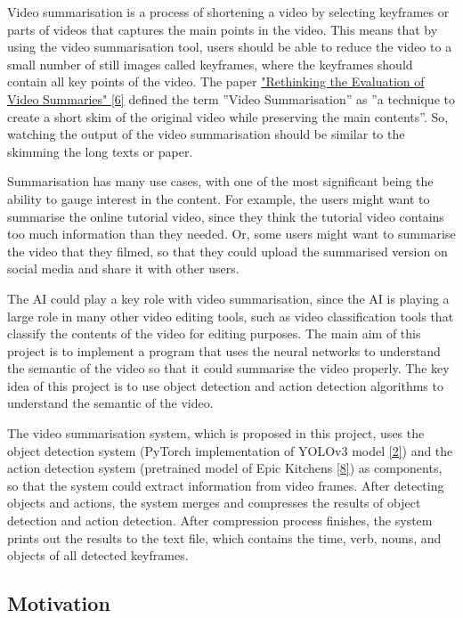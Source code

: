 \documentclass{article}
\begin{document}
Video summarisation is a process of shortening a video by selecting keyframes or parts of videos that captures the main points in the video. This means that by using the video summarisation tool, users should be able to reduce the video to a small number of still images called keyframes, where the keyframes should contain all key points of the video. The paper \hyperlink{ref6}{"Rethinking the Evaluation of Video Summaries" [6]} defined the term ”Video Summarisation” as ”a technique to create a short skim of the original video while preserving the main contents”. So, watching the output of the video summarisation should be similar to the skimming the long texts or paper.

Summarisation has many use cases, with one of the most significant being the ability to gauge interest in the content. For example, the users might want to summarise the online tutorial video, since they think the tutorial video contains too much information than they needed. Or, some users might want to summarise the video that they filmed, so that they could upload the summarised version on social media and share it with other users.

The AI could play a key role with video summarisation, since the AI is playing a large role in many other video editing tools, such as video classification tools that classify the contents of the video for editing purposes. The main aim of this project is to implement a program that uses the neural networks to understand the semantic of the video so that it could summarise the video properly. The key idea of this project is to use object detection and action detection algorithms to understand the semantic of the video.

The video summarisation system, which is proposed in this project, uses the object detection system (PyTorch implementation of YOLOv3 model \hyperlink{ref2}{[2]}) and the action detection system (pretrained model of Epic Kitchens \hyperlink{ref8}{[8]}) as components, so that the system could extract information from video frames. After detecting objects and actions, the system merges and compresses the results of object detection and action detection. After compression process finishes, the system prints out the results to the text file, which contains the time, verb, nouns, and objects of all detected keyframes.


\subsection{Motivation}
\end{document}
